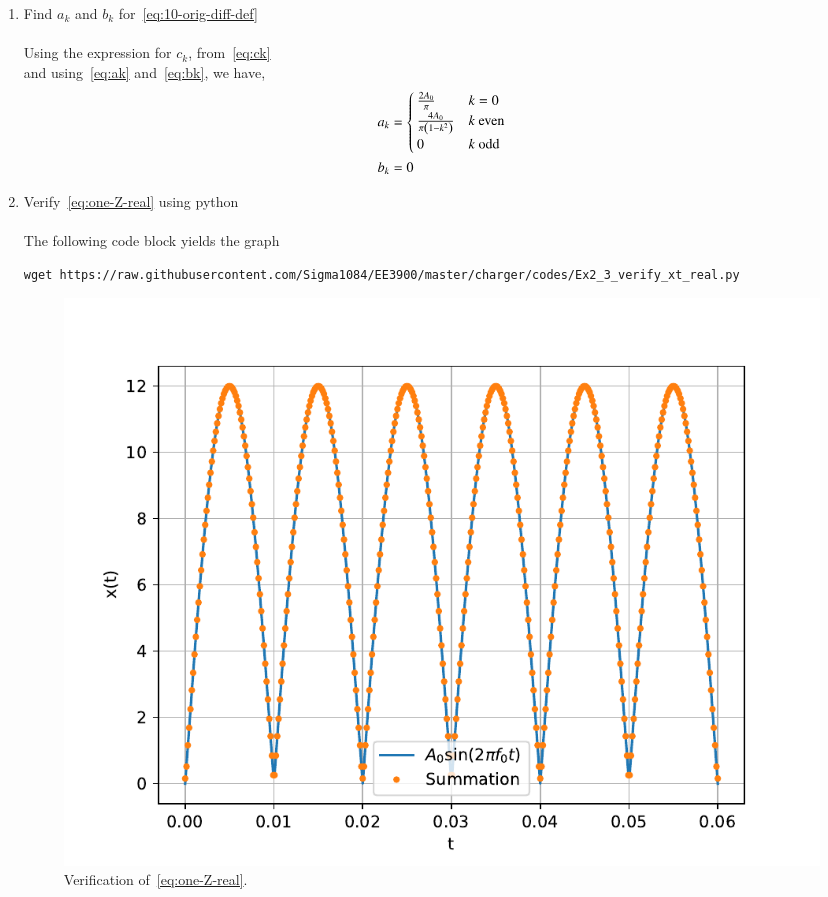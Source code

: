 \documentclass[journal,12pt,twocolumn]{IEEEtran}
\renewcommand\thesection{\arabic{section}}
\begin{document}
\begin{enumerate}[label=\thesection.\arabic*,ref=\thesection.\theenumi]
\item Find $a_k$ and $b_k$ for~\eqref{eq:10-orig-diff-def} \\
	\solution \\
	Using the expression for \( c_k \), from~\eqref{eq:ck} \\
	and using~\eqref{eq:ak} and~\eqref{eq:bk}, we have,
	\begin{align*}
		a_k &= 
			\begin{cases}
				\frac{2A_0}{\pi} & k = 0 \\
				\frac{4A_0}{\pi\left(1-k^2\right)} & k \text{ even} \\
				0 & k \text{ odd}
			\end{cases} \\
		b_k &= 0
	\end{align*}

\pagebreak

\item Verify~\eqref{eq:one-Z-real} using python \\
	\solution \\
	The following code block yields the graph
	\begin{lstlisting}
wget https://raw.githubusercontent.com/Sigma1084/EE3900/master/charger/codes/Ex2_3_verify_xt_real.py
	\end{lstlisting}
	\begin{figure}[!ht]
	\includegraphics[width=\columnwidth]{figs/Ex2_4_verify_xt_real}
		\caption{Verification of~\eqref{eq:one-Z-real}.}
		\label{fig:verify_xt_real}
	\end{figure}

\end{enumerate}
\end{document}
